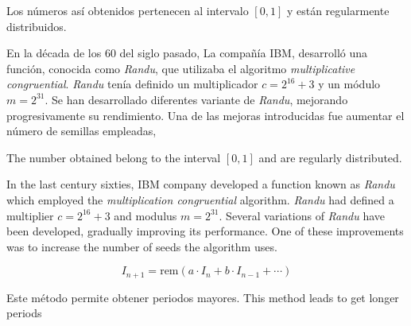 \begin{paracol}{2}
Los números así obtenidos pertenecen al intervalo $[0,1]$ y están regularmente distribuidos. 

En la década de los 60 del siglo pasado, La compañía IBM, desarrolló una función, conocida como \emph{Randu}, que utilizaba el algoritmo \emph{multiplicative congruential}. \emph{Randu} tenía definido un multiplicador $c=2^{16}+3$ y un módulo $m=2^{31}$. 
Se han desarrollado diferentes variante de \emph{Randu}, mejorando progresivamente su rendimiento. Una de las mejoras introducidas fue aumentar el número de semillas empleadas,

\switchcolumn
The number obtained belong to the interval $[0,1]$ and are regularly distributed.

In the last century sixties, IBM company developed a function known as \emph{Randu} which employed the \emph{multiplication congruential} algorithm. \emph{Randu} had defined a multiplier $c=2^{16}+3$ and modulus $m=2^{31}$.
Several variations of \emph{Randu} have been developed, gradually improving its performance. One of these improvements was to increase the number of seeds the algorithm uses.  
\end{paracol}
\begin{equation*}
I_{n+1}=\text{rem}(a\cdot I_n+b\cdot I_{n-1}+\cdots)
\end{equation*} 
\begin{paracol}{2}
Este método permite obtener periodos mayores.
\switchcolumn
This method leads to get longer periods
\end{paracol}

